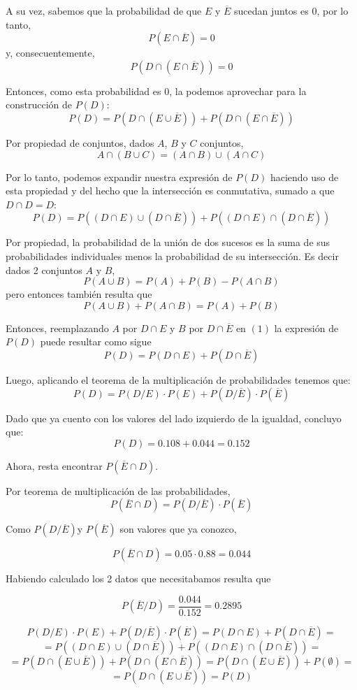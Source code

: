 \documentclass[11pt]{article}
\begin{document}
A su vez, sabemos que la probabilidad de que $E$ y $\overline{E}$ sucedan juntos es $0$, por lo tanto, 
\[P(E\cap \overline{E}) = 0\] y, consecuentemente, \[P(D\cap (E \cap \overline{E})) = 0\] 

Entonces, como esta probabilidad es $0$, la podemos aprovechar para la construcci\'on de $P(D)$: 
\[P(D) = P(D \cap (E \cup \overline{E})) + P(D\cap (E \cap \overline{E}))\]

Por propiedad de conjuntos, dados $A$, $B$ y $C$ conjuntos, 
\[A \cap (B\cup C) = (A\cap B) \cup (A\cap C)\]

Por lo tanto, podemos expandir nuestra expresi\'on de $P(D)$ haciendo uso de esta propiedad y del hecho que la intersecci\'on es conmutativa, sumado a que $D\cap D = D$: 
\[P(D) = P((D \cap E) \cup (D \cap \overline{E})) + P((D\cap E) \cap (D \cap \overline{E}))\]

Por propiedad, la probabilidad de la uni\'on de dos sucesos es la suma de sus probabilidades individuales menos la probabilidad de su intersecci\'on. Es decir dados 2 conjuntos $A$ y $B$, 
\[P(A\cup B)= P(A)+P(B)-P(A \cap B)\]
pero entonces tambi\'en resulta que 
\begin{equation}
P(A\cup B) + P(A\cap B) = P(A) + P(B)
\end{equation}

Entonces, reemplazando $A$ por $D\cap E$ y $B$ por $D\cap \overline{E}$ en $(1)$ la expresi\'on de $P(D)$ puede resultar como sigue
\[P(D) = P(D\cap E) + P(D\cap \overline{E})\]

Luego, aplicando el teorema de la multiplicaci\'on de
probabilidades tenemos que: 
\[P(D) = P(D/E)\cdot P(E) + P(D/\overline{E}) \cdot P(\overline{E})\]

Dado que ya cuento con los valores del lado izquierdo de la igualdad, concluyo que: 
\[P(D) = 0.108 + 0.044 = 0.152\]

Ahora, resta encontrar $P(\overline{E}\cap D)$. 

Por teorema de multiplicaci\'on de las probabilidades, 
\[P(\overline{E}\cap D) = P(D/\overline{E})\cdot P(\overline{E})\]

Como $P(D/\overline{E})$y $P(\overline{E})$ son valores que ya conozco, 

\[P(\overline{E}\cap D) = 0.05 \cdot 0.88 = 0.044\] 

Habiendo calculado los 2 datos que necesitabamos resulta que 

\[P(\overline{E}/D) = \frac{0.044}{0.152} = 0.2895\]


$$P(D/E) \cdot P(E) + P(D/\overline{E}) \cdot P(\overline{E}) = P(D \cap E) + P(D \cap \overline{E}) = $$
$$ = P((D \cap E) \cup (D \cap \overline{E})) + P((D \cap E) \cap (D \cap \overline{E})) = $$
$$ = P(D \cap (E \cup \overline{E})) + P(D \cap (E \cap \overline{E})) = P(D \cap (E \cup \overline{E})) + P(\emptyset) = $$
$$ = P(D \cap (E \cup \overline{E})) = P(D) $$
\end{document}
